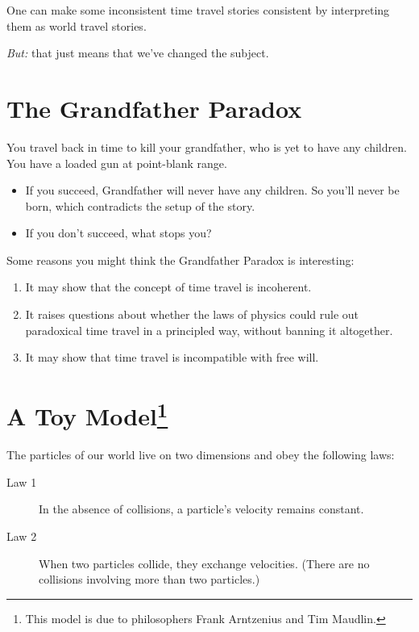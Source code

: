 \documentclass[12pt]{extarticle}
\begin{document}
One can make some inconsistent time travel stories consistent by interpreting them as world travel stories. 

\vspace{3mm}
\noindent
\emph{But:} that just means that we've changed the subject.


\section{The Grandfather Paradox}


You travel back in time to kill your grandfather, who is yet to have any children. You have a loaded gun at point-blank range. 

\begin{itemize}

\item If you succeed, Grandfather will never have any children. So you'll never be born, which contradicts the setup of the story.

\item If you don't succeed, what stops you?


\end{itemize}
Some reasons you might think the Grandfather Paradox is interesting:

\begin{enumerate}

\item It may show that the concept of time travel is incoherent.

\item It raises questions about whether the laws of physics could rule out paradoxical time travel in a principled way, without banning it altogether.

\item It may show that time travel is incompatible with free will.


\end{enumerate}


\section{A Toy Model\footnote{This model is due to philosophers Frank Arntzenius and Tim Maudlin.}}

The particles of our world live on two dimensions and obey the following laws:
\begin{description}
\item[Law 1]  In the absence of collisions, a particle's velocity remains constant.


\item[Law 2] When two particles collide, they exchange velocities. (There are no collisions involving more than two particles.)

\end{description}
\end{document}
